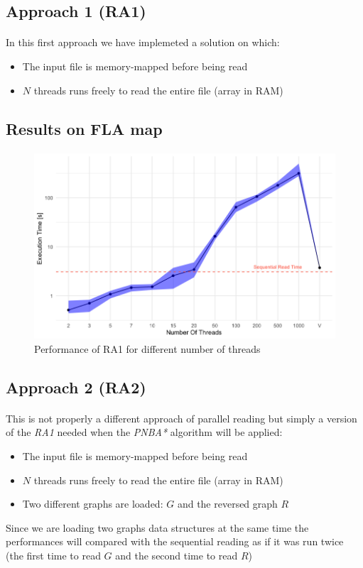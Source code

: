 \documentclass[12pt]{beamer}
\begin{document}
	\subsection{Approach 1 (RA1)}
	\begin{frame}{\secname}
		\framesubtitle{\subsecname}
		In this first approach we have implemeted a solution on which:
		\begin{itemize}
			\item The input file is memory-mapped before being read
			\item $N$ threads runs freely to read the entire file (array in RAM)
		\end{itemize}
	\end{frame}
	\subsection{Results on FLA map}
	\begin{frame}{\secname}
		\framesubtitle{\subsecname}
		\begin{figure}[ht!]
			\centering
			\includegraphics[width=0.85\linewidth]{read/par_read_1_time.png}
			\caption{Performance of RA1 for different number of threads}
			\label{parread1time}
	 	 \end{figure}	
	\end{frame}
	\subsection{Approach 2 (RA2)}
	\begin{frame}{\secname}
		\framesubtitle{\subsecname}
		This is not properly a different approach of parallel reading but simply a version
		of the \textit{RA1} needed when the \textit{PNBA*} algorithm will be applied:
		\begin{itemize}
			\item The input file is memory-mapped before being read
			\item $N$ threads runs freely to read the entire file (array in RAM)
			\item Two different graphs are loaded: $G$ and the reversed graph $R$
		\end{itemize}
		Since we are loading two graphs data structures at the same time the performances will
		compared with the sequential reading as if it was run twice (the first time to read $G$ and
		the second time to read $R$)
	\end{frame}
\end{document}
